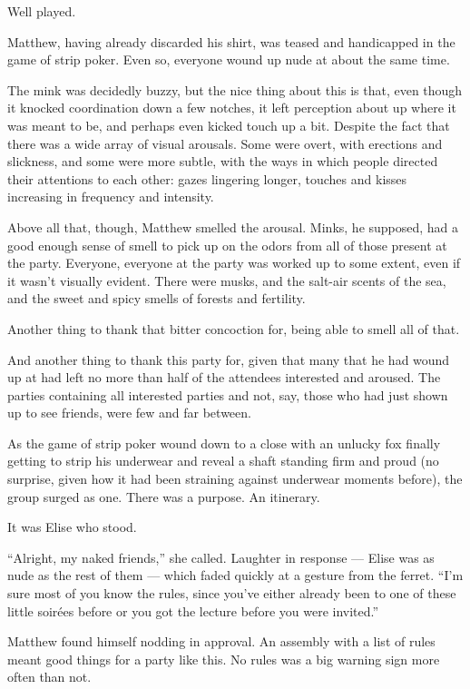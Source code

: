 Well played.

Matthew, having already discarded his shirt, was teased and handicapped in the game of strip poker. Even so, everyone wound up nude at about the same time.

The mink was decidedly buzzy, but the nice thing about this is that, even though it knocked coordination down a few notches, it left perception about up where it was meant to be, and perhaps even kicked touch up a bit. Despite the fact that there was a wide array of visual arousals. Some were overt, with erections and slickness, and some were more subtle, with the ways in which people directed their attentions to each other: gazes lingering longer, touches and kisses increasing in frequency and intensity.

Above all that, though, Matthew smelled the arousal. Minks, he supposed, had a good enough sense of smell to pick up on the odors from all of those present at the party. Everyone, everyone at the party was worked up to some extent, even if it wasn't visually evident. There were musks, and the salt-air scents of the sea, and the sweet and spicy smells of forests and fertility.

Another thing to thank that bitter concoction for, being able to smell all of that.

And another thing to thank this party for, given that many that he had wound up at had left no more than half of the attendees interested and aroused. The parties containing all interested parties and not, say, those who had just shown up to see friends, were few and far between.

As the game of strip poker wound down to a close with an unlucky fox finally getting to strip his underwear and reveal a shaft standing firm and proud (no surprise, given how it had been straining against underwear moments before), the group surged as one. There was a purpose. An itinerary.

It was Elise who stood.

``Alright, my naked friends,'' she called. Laughter in response --- Elise was as nude as the rest of them --- which faded quickly at a gesture from the ferret. ``I'm sure most of you know the rules, since you've either already been to one of these little soirées before or you got the lecture before you were invited.''

Matthew found himself nodding in approval. An assembly with a list of rules meant good things for a party like this. No rules was a big warning sign more often than not.

